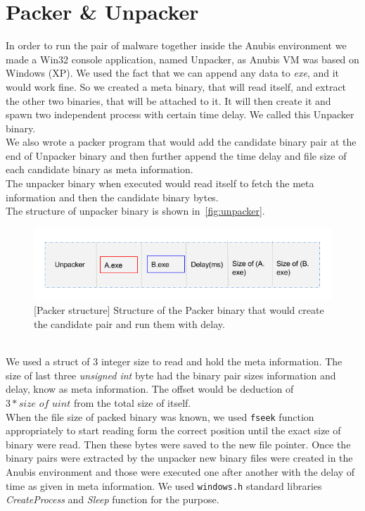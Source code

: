 \section{Packer \& Unpacker}
\label{sec:packerunpacker}
In order to run the pair of malware together inside the Anubis environment we made a Win32 console application, named Unpacker, as Anubis VM was based on Windows (XP).
We used the fact that we can append any data to \emph{exe}, and it would work fine.
So we created a meta binary, that will read itself, and extract the other two binaries, that will be attached to it.
It will then create it and spawn two independent process with certain time delay.
We called this Unpacker binary.\\
We also wrote a packer program that would add the candidate binary pair at the end of Unpacker binary and then further append the time delay and file size of each candidate binary as meta information.\\
The unpacker binary when executed would read itself to fetch the meta information and then the candidate binary bytes.\\
The structure of unpacker binary is shown in~\autoref{fig:unpacker}.\\
\begin{figure}[htbp]
  \centering
  \includegraphics[scale=0.5]{figures/unpacker.png}
\caption{[Packer structure] Structure of the Packer binary that would create the candidate pair and run them with delay.}
\label{fig:unpacker}
\end{figure}
\\
We used a struct of 3 integer size to read and hold the meta information. The size of last three \textit{unsigned int} byte had the binary pair sizes information and delay, know as meta information.
The offset would be deduction of $3 * \textit{size of uint}$ from the total size of itself.\\
When the file size of packed binary was known, we used \texttt{fseek\(\)} function appropriately to start reading form the correct position until the exact size of binary were read.
Then these bytes were saved to the new file pointer. Once the binary pairs were extracted by the unpacker new binary files were created in the Anubis environment and those were executed one after another with the delay of time as given in meta information.
We used \texttt{windows.h} standard libraries \emph{CreateProcess} and \emph{Sleep} function for the purpose.\\

